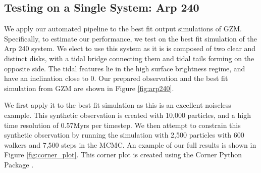 \subsection{Testing on a Single System: Arp 240}
We apply our automated pipeline to the best fit output simulations of GZM. Specifically, to estimate our performance, we test on the best fit simulation of the Arp 240 system. We elect to use this system as it is is composed of two clear and distinct disks, with a tidal bridge connecting them and tidal tails forming on the opposite side. The tidal features lie in the high surface brightness regime, and have an inclination close to 0. Our prepared observation and the best fit simulation from GZM are shown in Figure \ref{fig:arp240}.

We first apply it to the best fit simulation as this is an excellent noiseless example. This synthetic observation is created with 10,000 particles, and a high time resolution of 0.57Myrs per timestep. We then attempt to constrain this synthetic observation by running the simulation with 2,500 particles with 600 walkers and 7,500 steps in the MCMC. An example of our full results is shown in Figure \ref{fig:corner_plot}. This corner plot is created using the Corner Python Package \citep{corner}.

